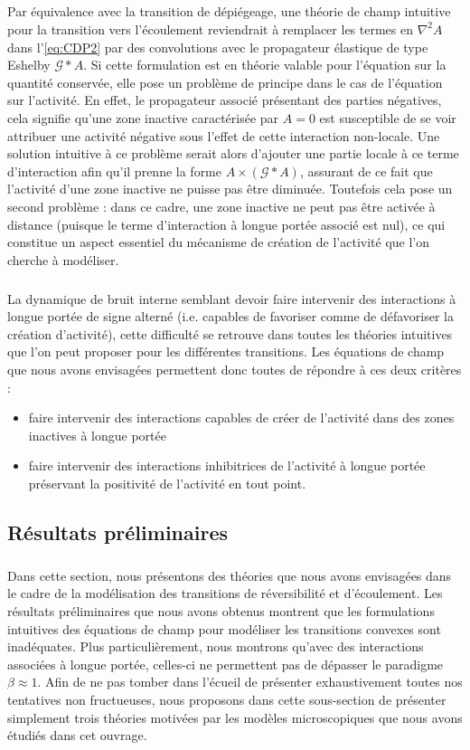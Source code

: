 \subparagraph{}Par équivalence avec la transition de dépiégeage, une théorie de champ intuitive pour la transition vers l'écoulement reviendrait à remplacer les termes en $\nabla^2 A$ dans l'\autoref{eq:CDP2} par des convolutions avec le propagateur élastique de type Eshelby $\mathcal{G}\ast A$. Si cette formulation est en théorie valable pour l'équation sur la quantité conservée, elle pose un problème de principe dans le cas de l'équation sur l'activité. En effet, le propagateur associé présentant des parties négatives, cela signifie qu'une zone inactive caractérisée par $A = 0$ est susceptible de se voir attribuer une activité négative sous l'effet de cette interaction non-locale. Une solution intuitive à ce problème serait alors d'ajouter une partie locale à ce terme d'interaction afin qu'il prenne la forme $A\times (\mathcal{G}\ast A)$, assurant de ce fait que l'activité d'une zone inactive ne puisse pas être diminuée. Toutefois cela pose un second problème : dans ce cadre, une zone inactive ne peut pas être activée à distance (puisque le terme d'interaction à longue portée associé est nul), ce qui constitue un aspect essentiel du mécanisme de création de l'activité que l'on cherche à modéliser.

\subparagraph{}La dynamique de bruit interne semblant devoir faire intervenir des interactions à longue portée de signe alterné (i.e. capables de favoriser comme de défavoriser la création d'activité), cette difficulté se retrouve dans toutes les théories intuitives que l'on peut proposer pour les différentes transitions. Les équations de champ que nous avons envisagées permettent donc toutes de répondre à ces deux critères :

\begin{itemize}
	\item faire intervenir des interactions capables de créer de l'activité dans des zones inactives à longue portée
	\item faire intervenir des interactions inhibitrices de l'activité à longue portée préservant la positivité de l'activité en tout point.
\end{itemize}

\subsection{Résultats préliminaires}

\subparagraph{}Dans cette section, nous présentons des théories que nous avons envisagées dans le cadre de la modélisation des transitions de réversibilité et d'écoulement. Les résultats préliminaires que nous avons obtenus montrent que les formulations intuitives des équations de champ pour modéliser les transitions convexes sont inadéquates. Plus particulièrement, nous montrons qu'avec des interactions associées à longue portée, celles-ci ne permettent pas de dépasser le paradigme $\beta \approx 1$. Afin de ne pas tomber dans l'écueil de présenter exhaustivement toutes nos tentatives non fructueuses, nous proposons dans cette sous-section de présenter simplement trois théories motivées par les modèles microscopiques que nous avons étudiés dans cet ouvrage.

